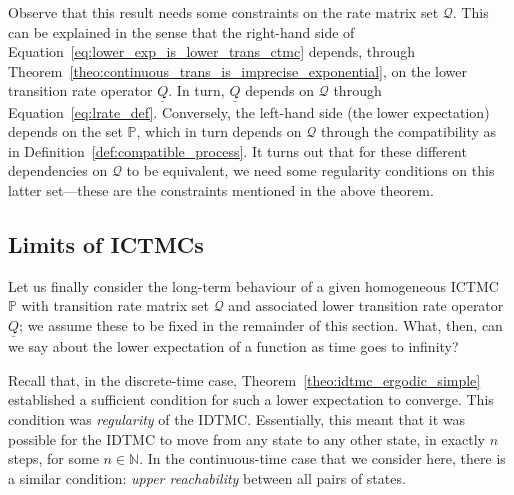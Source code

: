 \documentclass[graybox]{svmult}
\newcommand{\nats}{\mathbb{N}}
\newcommand{\lrate}{\underline{Q}}
\begin{document}
Observe that this result needs some constraints on the rate matrix set $\mathcal{Q}$. This can be explained in the sense that the right-hand side of Equation~\eqref{eq:lower_exp_is_lower_trans_ctmc} depends, through Theorem~\ref{theo:continuous_trans_is_imprecise_exponential}, on the lower transition rate operator $\underline{Q}$. In turn, $\underline{Q}$ depends on $\mathcal{Q}$ through Equation~\eqref{eq:lrate_def}. Conversely, the left-hand side (the lower expectation) depends on the set $\mathbb{P}$, which in turn depends on $\mathcal{Q}$ through the compatibility as in Definition~\ref{def:compatible_process}. It turns out that for these different dependencies on $\mathcal{Q}$ to be equivalent, we need some regularity conditions on this latter set---these are the constraints mentioned in the above theorem. 

\subsection{Limits of ICTMCs}

Let us finally consider the long-term behaviour of a given homogeneous ICTMC $\mathbb{P}$ with transition rate matrix set $\mathcal{Q}$ and associated lower transition rate operator $\lrate$; we assume these to be fixed in the remainder of this section. What, then, can we say about the lower expectation of a function as time goes to infinity?

Recall that, in the discrete-time case, Theorem~\ref{theo:idtmc_ergodic_simple} established a sufficient condition for such a lower expectation to converge. This condition was \emph{regularity} of the IDTMC. Essentially, this meant that it was possible for the IDTMC to move from any state to any other state, in exactly $n$ steps, for some $n\in\nats$. In the continuous-time case that we consider here, there is a similar condition: \emph{upper reachability} between all pairs of states.
\end{document}
